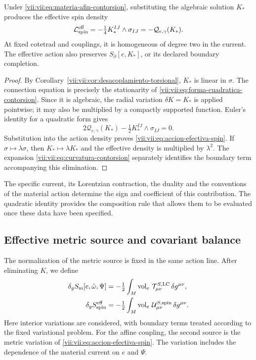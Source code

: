 \begin{theorem}
\label{vii:vii:thm:respuesta-cuadratica}
Under \eqref{vii:vii:eq:materia-afin-contorsion}, substituting the algebraic solution \(K_*\) produces the effective spin density
\begin{equation}
 \mathcal L_{\rm spin}^{\rm eff}
 =-\tfrac14 K_*^{IJ}\wedge\sigma_{IJ}
 =-\mathcal Q_{e,\gamma}(K_*).
 \label{vii:vii:eq:accion-efectiva-spin}
\end{equation}
At fixed cotetrad and couplings, it is homogeneous of degree two in the current. The effective action also preserves \(S_\partial[e,K_*]\), or its declared boundary completion.
\end{theorem}
\begin{proof}
By Corollary~\ref{vii:vii:cor:desacoplamiento-torsional}, \(K_*\) is linear in \(\sigma\). The connection equation is precisely the stationarity of \eqref{vii:vii:eq:forma-cuadratica-contorsion}. Since it is algebraic, the radial variation \(\delta K=K_*\) is applied pointwise; it may also be multiplied by a compactly supported function. Euler's identity for a quadratic form gives
\[
 2\mathcal Q_{e,\gamma}(K_*)
             -\tfrac12K_*^{IJ}\wedge\sigma_{IJ}=0.
\]
Substitution into the action density proves \eqref{vii:vii:eq:accion-efectiva-spin}. If \(\sigma\mapsto\lambda\sigma\), then \(K_*\mapsto\lambda K_*\) and the effective density is multiplied by \(\lambda^2\). The expansion \eqref{vii:vii:eq:curvatura-contorsion} separately identifies the boundary term accompanying this elimination.
\end{proof}

The specific current, its Lorentzian contraction, the duality and the conventions of the material action determine the sign and coefficient of this contribution. The quadratic identity provides the composition rule that allows them to be evaluated once these data have been specified.

\subsection{Effective metric source and covariant balance}
\label{vii:vii:subsec:fuente-metrica-efectiva}

The normalization of the metric source is fixed in the same action line. After eliminating \(K\), we define
\begin{align}
 \delta_g S_{\rm m}[e,\mathring\omega,\Psi]
 &=-\tfrac12\int_M\operatorname{vol}_e\,
                   \mathcal T^{S,\rm LC}_{\mu\nu}\,\delta g^{\mu\nu},
 \\
 \delta_g S_{\rm spin}^{\rm eff}
 &=-\tfrac12\int_M\operatorname{vol}_e\,
                   \mathcal U^{S,\rm spin}_{\mu\nu}\,\delta g^{\mu\nu}.
 \label{vii:vii:eq:fuentes-normalizadas-accion}
\end{align}
Here interior variations are considered, with boundary terms treated according to the fixed variational problem. For the affine coupling, the second source is the metric variation of \eqref{vii:vii:eq:accion-efectiva-spin}. The variation includes the dependence of the material current on \(e\) and \(\Psi\).

